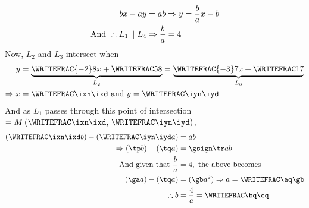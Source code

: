 \begin{solution}[\halfpage]
	\begin{align}
		bx - ay &= ab \Rightarrow y = \dfrac{b}{a}x -b \\
		\text{And }\therefore L_1 \parallel L_4 &\Rightarrow \dfrac{b}{a} = 4 
	\end{align}
	Now, $L_2$ and $L_3$ intersect when 
	\begin{align}
		y &= \underbrace{\WRITEFRAC{-\vbone}\vbtwo x  + \WRITEFRAC\vbthree\vbtwo}_{L_2} 
		 = \underbrace{\WRITEFRAC{-\vbfour}\vbfive x + \WRITEFRAC\vbsix\vbfive}_{L_3} \\
		 \Rightarrow x &= \WRITEFRAC\ixn\ixd \text{ and } y = \WRITEFRAC\iyn\iyd
	\end{align}
	And as $L_1$ passes through this point of intersection 
	$ = M\left( \WRITEFRAC\ixn\ixd,\,\WRITEFRAC\iyn\iyd\right)$, 
	\begin{align}
		\left(\WRITEFRAC\ixn\ixd b\right) - \left( \WRITEFRAC\iyn\iyd a \right)&= ab \\
		\Rightarrow (\tp b) - (\tq a) &= \gsign\tr ab \\
		\text{And given that } \dfrac{b}{a} &= \vbseven, \text{ the above becomes } \\
		(\ga a) - (\tq a) &= (\gb a^2) \Rightarrow a = \WRITEFRAC\aq\gb \\
		\therefore b &= \frac{\vbseven}{a} = \WRITEFRAC\bq\cq
	\end{align}
\end{solution}

